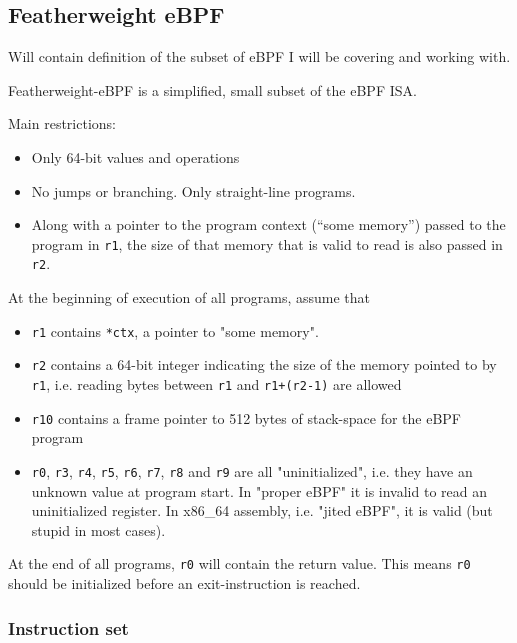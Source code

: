 \subsection{Featherweight eBPF}
\label{subsec:featherweight_ebpf}
Will contain definition of the subset of eBPF I will be covering and working with.


Featherweight-eBPF is a simplified, small subset of the eBPF ISA.

Main restrictions:
\begin{itemize}
\item Only 64-bit values and operations
\item No jumps or branching. Only straight-line programs.
\item Along with a pointer to the program context (``some memory'') passed to the program in \texttt{r1}, the size of that memory that is valid to read is also passed in \texttt{r2}. 
\end{itemize}


At the beginning of execution of all programs, assume that
\begin{itemize}
\item \texttt{r1} contains \texttt{*ctx}, a pointer to "some memory".
\item \texttt{r2} contains a 64-bit integer indicating the size of the memory pointed to by \texttt{r1}, i.e. reading bytes between \texttt{r1} and \texttt{r1+(r2-1)} are allowed
\item \texttt{r10} contains a frame pointer to 512 bytes of stack-space for the eBPF program
\item \texttt{r0}, \texttt{r3}, \texttt{r4}, \texttt{r5}, \texttt{r6}, \texttt{r7}, \texttt{r8} and \texttt{r9} are all "uninitialized", i.e. they have an unknown value at program start. In "proper eBPF" it is invalid to read an uninitialized register. In x86\_64 assembly, i.e. "jited eBPF", it is valid (but stupid in most cases).

\end{itemize}

At the end of all programs, \texttt{r0} will contain the return value. 
This means \texttt{r0} should be initialized before an exit-instruction is reached.
\subsubsection*{Instruction set}

